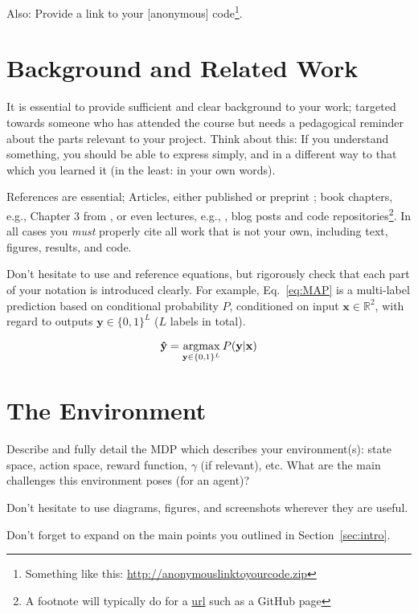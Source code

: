 \documentclass[journal, a4paper]{IEEEtran}
\newcommand{\argmax}{\operatornamewithlimits{argmax}}
\newcommand{\x}{\mathbf{x}}
\newcommand{\y}{\mathbf{y}}
\newcommand{\ypred}{\mathbf{\hat y}}
\begin{document}
Also: 
		Provide a link to your [anonymous] code\footnote{Something like this: \url{http://anonymouslinktoyourcode.zip}}. 

\section{Background and Related Work}

It is essential to provide sufficient and clear background to your work; targeted towards someone who has attended the course but needs a pedagogical reminder about the parts relevant to your project. Think about this: If you understand something, you should be able to express simply, and in a different way to that which you learned it (in the least: in your own words). 

References are essential; Articles, either published \cite{Astar} or preprint \cite{DeepMindSC2}; book chapters, e.g., Chapter 3 from \cite{Barber}, or even lectures, e.g.,  \cite{Lecture3}, blog posts and code repositories\footnote{A footnote will typically do for a \url{url} such as a GitHub page}. In all cases you \emph{must} properly cite all work that is not your own, including text, figures, results, and code.

Don't hesitate to use and reference equations, but rigorously check that each part of your notation is introduced clearly. For example, Eq.~\eqref{eq:MAP} is a multi-label prediction based on conditional probability $P$, conditioned on input $\x \in \mathbb{R}^2$, with regard to outputs $\y \in \{0,1\}^L$ ($L$ labels in total). 

\begin{equation}
	\label{eq:MAP}
	\ypred = \argmax_{\y \in \{0,1\}^L} P(\y|\x)
\end{equation}

\section{The Environment}

Describe and fully detail the MDP which describes your environment(s): state space, action space, reward function, $\gamma$ (if relevant), etc. What are the main challenges this environment poses (for an agent)?

Don't hesitate to use diagrams, figures, and screenshots wherever they are useful. 

Don't forget to expand on the main points you outlined in Section~\ref{sec:intro}.
\end{document}
